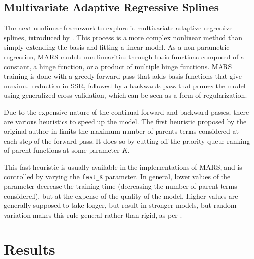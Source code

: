 \documentclass[11pt]{article}
\begin{document}
\subsection{Multivariate Adaptive Regressive Splines}
The next nonlinear framework to explore is multivariate adaptive regressive splines, introduced by \cite{mars}.  This process is a more complex nonlinear method than simply extending the basis and fitting a linear model.  As a non-parametric regression, MARS models non-linearities through basis functions composed of a constant, a hinge function, or a product of multiple hinge functions.  MARS training is done with a greedy forward pass that adds basis functions that give maximal reduction in SSR, followed by a backwards pass that prunes the model using generalized cross validation, which can be seen as a form of regularization.\par
Due to the expensive nature of the continual forward and backward passes, there are various heuristics to speed up the model.  The first heuristic proposed by the original author in \cite{fastmars} limits the maximum number of parents terms considered at each step of the forward pass.  It does so by cutting off the priority queue ranking of parent functions at some parameter $K$.\par
This fast heuristic is usually available in the implementations of MARS, and is controlled by varying the \lstinline{fast_K} parameter.  In general, lower values of the parameter decrease the training time (decreasing the number of parent terms considered), but at the expense of the quality of the model.  Higher values are generally supposed to take longer, but result in stronger models, but random variation makes this rule general rather than rigid, as per \cite{earth}.\par
\section{Results}\label{sec:results}
\end{document}
